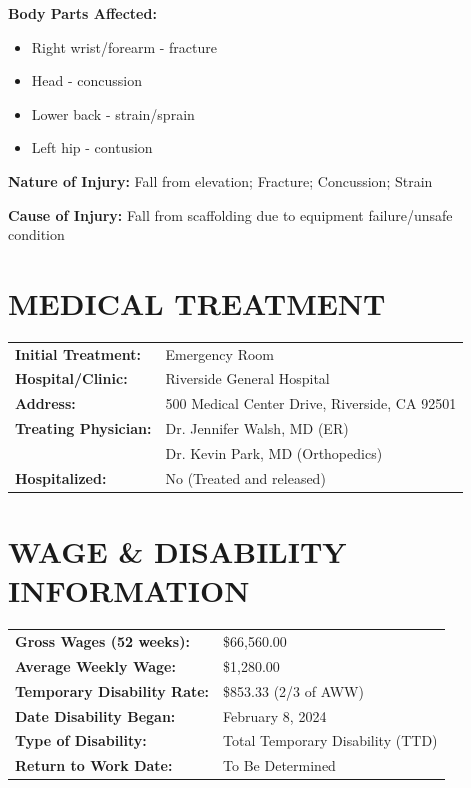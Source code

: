 \documentclass[11pt]{article}
\begin{document}
\textbf{Body Parts Affected:}
\begin{itemize}[nosep]
\item Right wrist/forearm - fracture
\item Head - concussion
\item Lower back - strain/sprain
\item Left hip - contusion
\end{itemize}

\textbf{Nature of Injury:} Fall from elevation; Fracture; Concussion; Strain

\textbf{Cause of Injury:} Fall from scaffolding due to equipment failure/unsafe condition

\section*{MEDICAL TREATMENT}

\begin{tabular}{@{}p{4cm}p{10cm}@{}}
\textbf{Initial Treatment:} & Emergency Room \\
\textbf{Hospital/Clinic:} & Riverside General Hospital \\
\textbf{Address:} & 500 Medical Center Drive, Riverside, CA 92501 \\
\textbf{Treating Physician:} & Dr. Jennifer Walsh, MD (ER) \\
& Dr. Kevin Park, MD (Orthopedics) \\
\textbf{Hospitalized:} & No (Treated and released) \\
\end{tabular}

\section*{WAGE \& DISABILITY INFORMATION}

\begin{tabular}{@{}p{5cm}p{9cm}@{}}
\textbf{Gross Wages (52 weeks):} & \$66,560.00 \\
\textbf{Average Weekly Wage:} & \$1,280.00 \\
\textbf{Temporary Disability Rate:} & \$853.33 (2/3 of AWW) \\
\textbf{Date Disability Began:} & February 8, 2024 \\
\textbf{Type of Disability:} & Total Temporary Disability (TTD) \\
\textbf{Return to Work Date:} & To Be Determined \\
\end{tabular}
\end{document}
